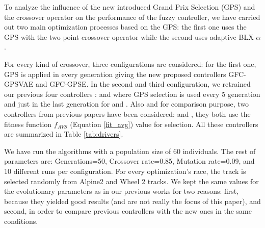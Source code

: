 \documentclass[10pt,journal,compsoc]{IEEEtran}
\begin{document}

To analyze the influence of the new introduced Grand Prix Selection
(GPS) and the crossover operator on the performance of the fuzzy
controller, we have carried out two main optimization processes based
on the GPS: the first one uses the GPS with the two point crossover
operator while the second uses adaptive BLX-$\alpha$.

For every kind of crossover, three configurations are considered: for
the first one, GPS is applied in every generation giving the new
proposed controllers {\sf GFC-GPSVAE} and {\sf GFC-GPSE}. 
In the second and third configuration, we retrained our previous four  controllers \cite{DBLP:conf/cig/SalemMG19}: {} and 
{} where GPS selection is used every 5 generation and just in the last generation for {} and {}.
Also and for comparison purpose, two controllers from previous papers have been considered: {}\cite{DBLP:conf/cig/SalemMG19} and {}\cite{salem_cig2018}, they both use the fitness function $f_{AVS}$ (Equation \ref{fit_avg}) value for selection.
All these controllers are summarized in Table \ref{tab:drivers}. 

We have run the algorithms with a population size of 60
individuals. The rest of parameters are: Generations=50, Crossover
rate=0.85, Mutation rate=0.09, and 10 different runs per
configuration. %
For every optimization's race, the track is selected randomly from Alpine2 and Wheel 2 tracks.
We kept the same values for the evolutionary parameters as in our previous works for two reasons: first, because they yielded good results (and are not really the focus of this paper), and second, in order to compare previous controllers with the new ones in the same conditions.
\end{document}
